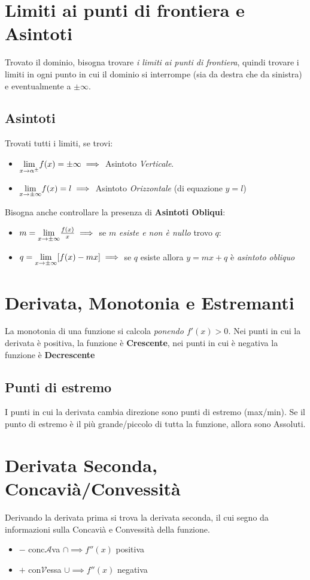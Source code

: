 \documentclass[12pt, a4paper, openany]{book}
\begin{document}
\section{Limiti ai punti di frontiera e Asintoti}
Trovato il dominio, bisogna trovare \emph{i limiti ai punti di frontiera},
quindi trovare i limiti in ogni punto in cui il dominio si interrompe (sia da destra che da sinistra) e eventualmente a $\pm \infty$.

\subsection{Asintoti}
Trovati tutti i limiti, se trovi:
\begin{itemize}
	\item $\underset{x \to \alpha^\pm}{\lim} f(x) = \pm \infty \implies$ Asintoto \emph{Verticale}.
	\item $\underset{x \to \pm \infty}{\lim} f(x) = l \implies$ Asintoto \emph{Orizzontale} (di equazione $y=l$)
\end{itemize}
Bisogna anche controllare la presenza di \textbf{Asintoti Obliqui}:
\begin{itemize}
	\item $m = \underset{x \to \pm \infty}{\lim} \frac{f(x)}{x} \implies$ se $m$ \emph{esiste e non è nullo} trovo $q$:
	\item $q = \underset{x \to \pm \infty}{\lim} [f(x) - mx]\implies$  se $q$ esiste allora $y=mx+q$ è \emph{asintoto obliquo}
\end{itemize}

\section{Derivata, Monotonia e Estremanti}
La monotonia di una funzione si calcola \emph{ponendo $f'(x)>0$.}
Nei punti in cui la derivata è positiva, la funzione è \textbf{Crescente}, nei punti in cui è negativa la funzione è \textbf{Decrescente}
\subsection{Punti di estremo} I punti in cui la derivata cambia direzione sono punti di estremo (max/min).
Se il punto di estremo è il più grande/piccolo di tutta la funzione, allora sono Assoluti.

\section{Derivata Seconda, Concavià/Convessità}
Derivando la derivata prima si trova la derivata seconda, il cui segno da informazioni sulla Concavià e Convessità della funzione.
\begin{itemize}
	\item $-$ conc$\mathcal{A}$va $\cap \implies f''(x)$ positiva
	\item $+$ con$\mathcal{V}$essa $\cup \implies f''(x)$ negativa
\end{itemize}
\end{document}
